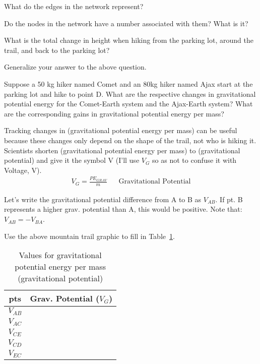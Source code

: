 \begin{alevel}
What do the edges in the network represent?
\end{alevel}
\begin{blevel}
Do the nodes in the network have a number associated with them? What is it?
\end{blevel}
\begin{alevel}
What is the total change in height when hiking from the parking lot, around the trail, and back to the parking lot?
\end{alevel}
\begin{blevel}
Generalize your answer to the above question.
\end{blevel}
\begin{blevel}
Suppose a 50 kg hiker named Comet and an 80kg hiker named Ajax start at the parking lot and hike to point D. What are the respective changes in gravitational potential energy for the Comet-Earth system and the Ajax-Earth system? What are the corresponding gains in gravitational potential energy per mass?
\end{blevel}

Tracking changes in (gravitational potential energy per mass) can be useful because these changes only depend on the shape of the trail, not who is hiking it. Scientists shorten (gravitational potential energy per mass) to (gravitational potential) and give it the symbol V (I'll use $V_G$ so as not to confuse it with Voltage, V).
\begin{align}
V_G=\frac{PE_{GRAV}}{m}&&\text{Gravitational Potential} \label{E:2GP}
\end{align}

Let's write the gravitational potential difference from A to B as $V_{AB}$. If pt. B represents a higher grav. potential than A, this would be positive. Note that: $V_{AB}=-V_{BA}$.

\begin{blevel}
Use the above mountain trail graphic to fill in Table~\ref{T:2GP}.
\end{blevel}

\begin{table}[H]
\begin{center}
\begin{tabular}{|c|c|}\hline
pts&Grav. Potential ($V_G$)\\ \hline
$V_{AB}$& \\ \hline
$V_{AC}$& \\ \hline
$V_{CE}$& \\ \hline
$V_{CD}$& \\ \hline
$V_{EC}$& \\ \hline
\end{tabular}
\caption{Values for gravitational potential energy per mass (gravitational potential)}
\label{T:2GP}
\end{center}
\end{table}

